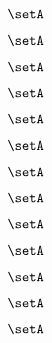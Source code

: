 \begin{forslides}
    \begin{equation}
        \label{eq:slides-processes-48}
        \setA
    \end{equation}

    \begin{equation}
        \label{eq:slides-processes-49}
        \setA
    \end{equation}
    
    \begin{equation}
        \label{eq:slides-processes-50}
        \setA
    \end{equation}

    \begin{equation}
        \label{eq:slides-processes-51}
        \setA
    \end{equation}

    \begin{equation}
        \label{eq:slides-processes-52}
        \setA
    \end{equation}

    \begin{equation}
        \label{eq:slides-processes-53}
        \setA
    \end{equation}

    \begin{equation}
        \label{eq:slides-processes-54}
        \setA
    \end{equation}

    \begin{equation}
        \label{eq:slides-processes-55}
        \setA
    \end{equation}

    \begin{equation}
        \label{eq:slides-processes-56}
        \setA
    \end{equation}

    \begin{equation}
        \label{eq:slides-processes-57}
        \setA
    \end{equation}

    \begin{equation}
        \label{eq:slides-processes-58}
        \setA
    \end{equation}

    \begin{equation}
        \label{eq:slides-processes-59}
        \setA
    \end{equation}
    
    \begin{equation}
        \label{eq:slides-processes-60}
        \setA
    \end{equation}


\end{forslides}

